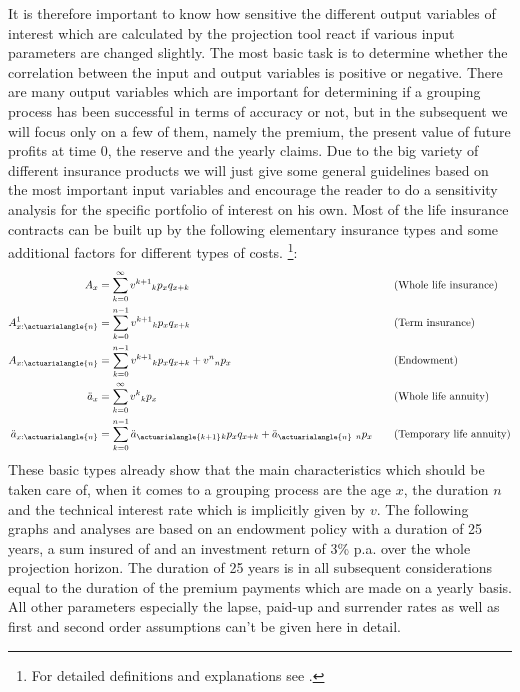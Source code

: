 It is therefore important to know how sensitive the different output variables of interest which are calculated by the projection tool react if various input parameters are changed slightly. The most basic task is to determine whether the correlation between the input and output variables is positive or negative. There are many output variables which are important for determining if a grouping process has been successful in terms of accuracy or not, but in the subsequent we will focus only on a few of them, namely the premium, the present value of future profits at time 0, the reserve and the yearly claims. Due to the big variety of different insurance products we will just give some general guidelines based on the most important input variables and encourage the reader to do a sensitivity analysis for the specific portfolio of interest on his own.  Most of the life insurance contracts can be built up by the following elementary insurance types and some additional factors for different types of costs. \footnote{For detailed definitions and explanations see \cite{Gerber}.}:
\begin{alignat}{2}
\label{equ:whole_life}
A_x &=\sum_{k=0}^{\infty}v^{k+1} {}_{k}p_x q_{x+k} \quad \quad \quad &&\text{(Whole life insurance)}\\
A_{x:\actuarialangle{n}}^1 &=\sum_{k=0}^{n-1}v^{k+1} {}_{k}p_x q_{x+k} \quad \quad \quad  &&\text{(Term insurance)}\\
A_{x:\actuarialangle{n}} &=\sum_{k=0}^{n-1}v^{k+1} {}_{k}p_x q_{x+k} + v^n{}_{n}p_x\quad \quad &&\text{(Endowment)} \\
\ddot{a}_x &= \sum_{k=0}^{\infty} v^k {}_{k}p_x \quad &&\text{(Whole life annuity)} \\
\label{equ:temp_annuity}
\ddot{a}_{x:\actuarialangle{n}} &= \sum_{k=0}^{n-1} \ddot{a}_{\actuarialangle{k+1}} {}_{k}p_x q_{x+k} + \ddot{a}_{\actuarialangle{n}}~{}_{n}p_x  \quad &&\text{(Temporary life annuity)}
\end{alignat}
These basic types already show that the main characteristics which should be taken care of, when it comes to a grouping process are the age $x$, the duration $n$ and the technical interest rate which is implicitly given by $v$.  The following graphs and analyses are based on an endowment policy with a duration of 25 years, a sum insured of  and an investment return of 3\% p.a. over the whole projection horizon. The duration of 25 years is in all subsequent considerations equal to the duration of the premium payments which are made on a yearly basis. All other parameters especially the lapse, paid-up and surrender rates as well as first and second order assumptions can't be given here in detail. 

